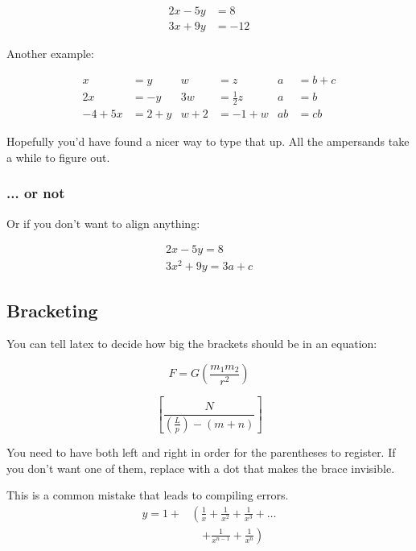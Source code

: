\begin{align*} 
	2x - 5y &=  8 \\ 
	3x + 9y &=  -12
\end{align*}

Another example:

\begin{align*}
	x&=y           &  w &=z              &  a&=b+c\\
	2x&=-y         &  3w&=\frac{1}{2}z   &  a&=b\\
	-4 + 5x&=2+y   &  w+2&=-1+w          &  ab&=cb
\end{align*}

Hopefully you'd have found a nicer way to type that up. All the ampersands take a while to figure out.

\subsubsection{... or not}
Or if you don't want to align anything: 

\begin{gather*} 
	2x - 5y =  8 \\ 
	3x^2 + 9y =  3a + c
\end{gather*}





\subsection{Bracketing}

You can tell latex to decide how big the brackets should be in an equation:

\[ 
F = G \left( \frac{m_1 m_2}{r^2} \right)
\]

 \[ 
\left[  \frac{ N } { \left( \frac{L}{p} \right)  - (m+n) }  \right]
\]


You need to have both left and right in order for the parentheses to register. If you don't want one of them, replace with a dot that makes the brace invisible.


 This is a common mistake that leads to compiling errors.
 \begin{equation}
 \begin{split}
 y  = 1 + & \left(  \frac{1}{x} + \frac{1}{x^2} + \frac{1}{x^3} + \ldots \right. \\
 & \quad \left. + \frac{1}{x^{n-1}} + \frac{1}{x^n} \right)
 \end{split}
 \end{equation}


